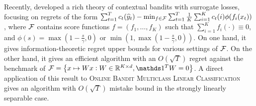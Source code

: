 Recently, \citet{Foster-Krishnamurthy-2018} developed a rich theory of
contextual bandits with surrogate losses, focusing on regrets of the form
$\sum_{t=1}^T c_t(\widehat{y}_t) - \min_{f \in \mathcal{F}} \sum_{t=1}^T \frac{1}{K}
\sum_{i=1}^K c_t(i) \phi( f_i(x_t) )$, where $\mathcal{F}$ contains score functions
$f = (f_1, \ldots, f_K)$ such that $\sum_{i=1}^K f_i(\cdot) \equiv 0$, and $\phi(s) = \max(1 - \frac
s \gamma, 0)$ or $\min(1, \max(1 - \frac s \gamma, 0))$. On one hand, it gives
information-theoretic regret upper bounds for various settings of $\mathcal{F}$. On
the other hand, it gives an efficient algorithm with an $O(\sqrt{T})$ regret
against the benchmark of $\calF = \cbr{x \mapsto W x: W \in \R^{K \times d},
\one^T W = 0}$. A direct application of this result to \textsc{Online Bandit
Multiclass Linear Classification} gives an algorithm with $O(\sqrt{T})$ mistake
bound in the strongly linearly separable case.




